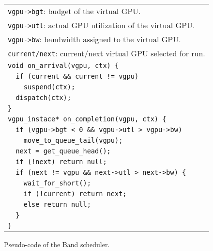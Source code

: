\begin{figure}[t]
 \begin{center}
  \begin{tabular}{l}
   \hline
   \hline
   {\small \verb|vgpu->bgt|: budget of the virtual GPU.}\\
   {\small \verb|vgpu->utl|: actual GPU utilization of the virtual GPU.}\\
   {\small \verb|vgpu->bw|: bandwidth assigned to the virtual
   GPU.}\\
   {\small \verb|current/next|: current/next virtual GPU selected for run.}\\
   \hline
   {\small \verb|void on_arrival(vgpu, ctx) {|}\\
   {\small \verb|  if (current && current != vgpu)|}\\
   {\small \verb|    suspend(ctx);|}\\
   {\small \verb|  dispatch(ctx);|}\\
   {\small \verb|}|}\\
   {\small \verb|vgpu_instace* on_completion(vgpu, ctx) {|}\\
   {\small \verb|  if (vgpu->bgt < 0 && vgpu->utl > vgpu->bw)|}\\
   {\small \verb|    move_to_queue_tail(vgpu);|}\\
   {\small \verb|  next = get_queue_head();|}\\
   {\small \verb|  if (!next) return null;|}\\
   {\small \verb|  if (next != vgpu && next->utl > next->bw) {|}\\
   {\small \verb|    wait_for_short();|}\\
   {\small \verb|    if (!current) return next;|}\\
   {\small \verb|    else return null;|}\\
   {\small \verb|  }|}\\
   {\small \verb|}|}\\
   \hline
  \end{tabular}
  \caption{Pseudo-code of the Band scheduler.}
  \label{fig:band}
 \end{center}
 \vspace{-1.5em}
\end{figure}

